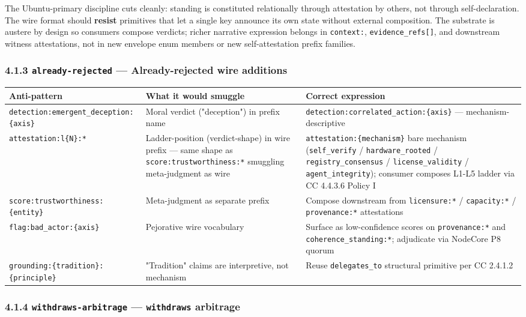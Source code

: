 \documentclass[11pt]{article}
\begin{document}
The Ubuntu-primary discipline cuts cleanly: standing is constituted relationally through attestation by others, not through self-declaration. The wire format should \textbf{resist} primitives that let a single key announce its own state without external composition. The substrate is austere by design so consumers compose verdicts; richer narrative expression belongs in \texttt{context:}, \texttt{evidence\_refs[]}, and downstream witness attestations, not in new envelope enum members or new self-attestation prefix families.


\subsubsection*{4.1.3 \texttt{already-rejected} — Already-rejected wire additions}


{\footnotesize
\begin{longtable}{|p{5.33cm}|p{5.33cm}|p{5.33cm}|}\hline
\textbf{Anti-pattern} & \textbf{What it would smuggle} & \textbf{Correct expression} \\ \hline\endhead
\texttt{detection:emergent\_deception:\{axis\}} & Moral verdict ("deception") in prefix name & \texttt{detection:correlated\_action:\{axis\}} — mechanism-descriptive \\ \hline
\texttt{attestation:l\{N\}:*} & Ladder-position (verdict-shape) in wire prefix — same shape as \texttt{score:trustworthiness:*} smuggling meta-judgment as wire & \texttt{attestation:\{mechanism\}} bare mechanism (\texttt{self\_verify} / \texttt{hardware\_rooted} / \texttt{registry\_consensus} / \texttt{license\_validity} / \texttt{agent\_integrity}); consumer composes L1-L5 ladder via CC 4.4.3.6 Policy I \\ \hline
\texttt{score:trustworthiness:\{entity\}} & Meta-judgment as separate prefix & Compose downstream from \texttt{licensure:*} / \texttt{capacity:*} / \texttt{provenance:*} attestations \\ \hline
\texttt{flag:bad\_actor:\{axis\}} & Pejorative wire vocabulary & Surface as low-confidence scores on \texttt{provenance:*} and \texttt{coherence\_standing:*}; adjudicate via NodeCore P8 quorum \\ \hline
\texttt{grounding:\{tradition\}:\{principle\}} & "Tradition" claims are interpretive, not mechanism & Reuse \texttt{delegates\_to} structural primitive per CC 2.4.1.2 \\ \hline
\end{longtable}}


\subsubsection*{4.1.4 \texttt{withdraws-arbitrage} — \texttt{withdraws} arbitrage}
\end{document}
